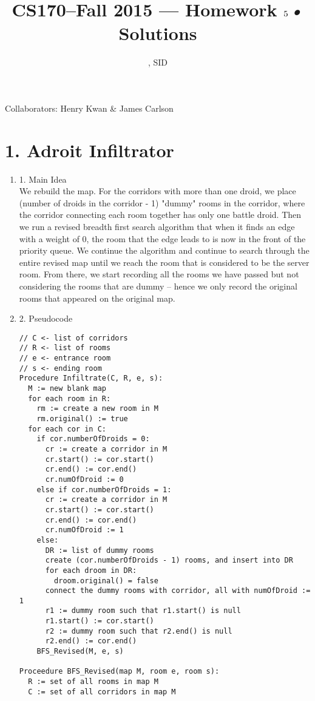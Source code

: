 \documentclass[11pt]{article}
\title{CS170--Fall 2015 --- Homework $5$\textsl{•} Solutions}
\author{\Name, SID \SID}
\date{}
\newenvironment{qparts}{\begin{enumerate}[{(}a{)}]}{\end{enumerate}}
\begin{document}
\maketitle

Collaborators: Henry Kwan \& James Carlson

\section*{1. Adroit Infiltrator}
\begin{qparts}
\item[1.] Main Idea \\ 
We rebuild the map. For the corridors with more than one droid, we place (number of droids in the corridor - 1) "dummy" rooms in the corridor, where the corridor connecting each room together has only one battle droid. Then we run a revised breadth first search algorithm that when it finds an edge with a weight of 0, the room that the edge leads to is now in the front of the priority queue. We continue the algorithm and continue to search through the entire revised map until we reach the room that is considered to be the server room. From there, we start recording all the rooms we have passed but not considering the rooms that are dummy -- hence we only record the original rooms that appeared on the original map.
\item[2.] Pseudocode
\begin{verbatim}
// C <- list of corridors
// R <- list of rooms
// e <- entrance room 
// s <- ending room
Procedure Infiltrate(C, R, e, s):
  M := new blank map
  for each room in R:
    rm := create a new room in M
    rm.original() := true
  for each cor in C:
    if cor.numberOfDroids = 0:
      cr := create a corridor in M
      cr.start() := cor.start()
      cr.end() := cor.end()
      cr.numOfDroid := 0
    else if cor.numberOfDroids = 1:
      cr := create a corridor in M
      cr.start() := cor.start()
      cr.end() := cor.end()
      cr.numOfDroid := 1
    else: 
      DR := list of dummy rooms
      create (cor.numberOfDroids - 1) rooms, and insert into DR
      for each droom in DR:
        droom.original() = false
      connect the dummy rooms with corridor, all with numOfDroid := 1
      r1 := dummy room such that r1.start() is null
      r1.start() := cor.start()
      r2 := dummy room such that r2.end() is null
      r2.end() := cor.end()
    BFS_Revised(M, e, s)

Proceedure BFS_Revised(map M, room e, room s): 
  R := set of all rooms in map M
  C := set of all corridors in map M
  

\end{verbatim}
\end{qparts}
\end{document}
